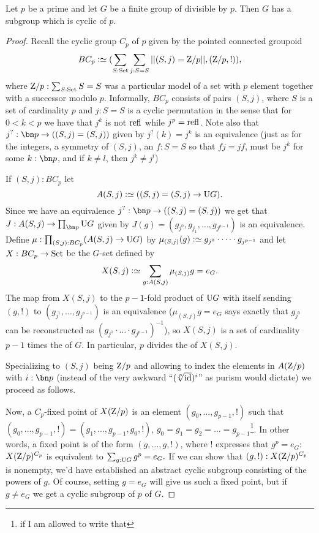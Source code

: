 \begin{theorem}
  \label{thm:cauchys}
  Let $p$ be a prime and let $G$ be a finite group of \gporder divisible by $p$.  
Then $G$ has a subgroup which is cyclic of \gporder $p$. 
\end{theorem}
\begin{proof}
Recall the cyclic group $C_p$ of \gporder $p$ given by the pointed connected groupoid
$$BC_p\defequi(\sum_{S:\Set}\sum_{j:S=S}||(S,j)=\zet/p||,(\zet/p,!)),
$$
 where $\mathrm{Z}/p:\sum_{S:\mathrm{Set}}S=S$ was a particular model of a set with $p$ element together with a successor modulo $p$.  Informally, $BC_p$ consists of pairs $(S,j)$, where $S$ is a set of cardinality $p$ and $j:S=S$ is a cyclic permutation in the sense that for $0<k<p$ we have that $j^k$ is not $\refl{}$ while $j^p=\refl{}$.  Note also that $j^?:\bn p\to ((S,j)=(S,j))$ given by $j^?(k)=j^k$ is an equivalence (just as for the integers, a symmetry of $(S,j)$, \ie an $f:S=S$ so that $fj=jf$, must be $j^k$ for some $k:\bn p$, and if $k\neq l$, then $j^k\neq j^l$)

If $(S,j):BC_p$ let 
$$A(S,j)\defequi ((S,j)=(S,j)\to \USym G).$$  Since we have an equivalence $j^?:\bn p\to ((S,j)=(S,j))$ we get that $J:A(S,j)\to \prod_{\bn p}\USym G$ given by $J(g)=(g_{j^0},g_{j_1},\dots,g_{j^{p-1}})$ is an equivalence.  Define $\mu:\prod_{(S,j):BC_p}(A(S,j)\to\mathrm{U} G)$ by $\mu_{(S,j)}(g)\defequi g_{j^0}\cdot\dots\cdot g_{j^{p-1}}$ and let $X:BC_p\to\mathrm{Set}$ be the $G$-set defined by  
$$X(S,j)\defequi\sum_{g:A(S,j)}\mu_{(S,j)}g=e_G.$$ 
The map from $X(S,j)$ to the $p-1$-fold product of $\mathrm{U} G$ with itself sending $(g,!)$ to $(g_{j^1},\dots,g_{j^{p-1}})$ is an equivalence ($\mu_{(S,j)}g=e_G$ says exactly that $g_{j^0}$ can be reconstructed as $(g_{j^1}\cdot\dots\cdot g_{j^{p-1}})^{-1}$), so $X(S,j)$ is a set of cardinality $p-1$ times the \gporder of $G$.  In particular, $p$ divides the \gporder of $X(S,j)$.

Specializing to $(S,j)$ being $\mathrm{Z}/p$ and allowing to index the elements in $A(\mathrm{Z}/p)$ with $i:\bn p$ (instead of the very awkward ``$(\sqrt[p]{\mathord{\mathrm{id}}})^i$'' as purism would dictate) we proceed as follows.

Now, a $C_p$-fixed point of $X(\mathrm{Z}/p)$ is an element $(g_0,\dots,g_{p-1},!)$ such that $(g_0,\dots,g_{p-1},!)=(g_1,\dots,g_{p-1},g_0,!)$, \ie $g_0=g_1=g_2=\dots=g_{p-1}$\footnote{if I am allowed to write that}.  In other words, a fixed point is of the form $(g,\dots,g,!)$, where $!$ expresses that $g^p=e_G$:
$X(\mathrm{Z}/p)^{C_p}$ is equivalent to $\sum_{g:\mathrm{U} G}g^p=e_G.$  If we can show that $(g,!):X(\mathrm{Z}/p)^{C_p}$ is nonempty, we'd have established an abstract cyclic subgroup consisting of the powers of $g$.  Of course, setting $g=e_G$ will give us such a fixed point, but if $g\neq e_G$ we get a cyclic subgroup of \gporder $p$ of $G$.


\end{proof}
